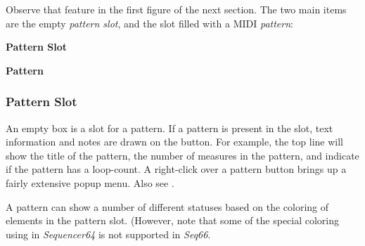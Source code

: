    Observe that feature in the first figure of the next section.
   The two main items are the empty \textsl{pattern slot}, and the slot filled
   with a MIDI \textsl{pattern}:

   \begin{enumber}
      \item \textbf{Pattern Slot}
      \item \textbf{Pattern}
   \end{enumber}

\subsubsection{Pattern Slot}
\label{subsubsec:patterns_pattern_slot}

   An empty box is a slot for a pattern.
   If a pattern is present in the slot, text information and notes are drawn on
   the button.
   For example, the top line will show
   the title of the pattern, the number of measures in the pattern, and
   indicate if the pattern has a loop-count.
   A right-click over a pattern button brings up a fairly extensive
   popup menu.
   Also see .

%

   A pattern can show a number of different statuses based on the coloring
   of elements in the pattern slot.
   (However, note that some of the special coloring using in
   \textsl{Sequencer64} is not supported in \textsl{Seq66}.

